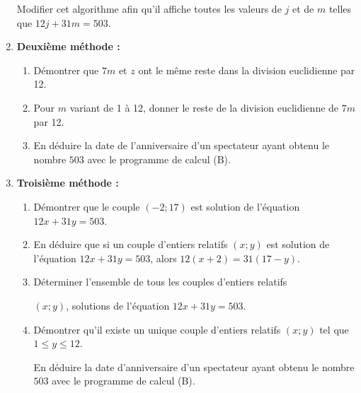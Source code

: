 \begin{enumerate}
Modifier cet algorithme afin qu'il affiche toutes les valeurs de $j$ et de $m$ telles que $12j+31m=503$.
\item
\textbf{Deuxième méthode :
}
\begin{enumerate}[label=\alph*.]
     \item
     Démontrer que $7m$ et $z$ ont le même reste dans la division euclidienne par 12.
     \item
     Pour $m$ variant de 1 à 12, donner le reste de la division euclidienne de $7m$ par 12.
     \item
En déduire la date de l'anniversaire d'un spectateur ayant obtenu le nombre $503$ avec le programme de calcul (B).\end{enumerate}
\item
\textbf{Troisième méthode :}
\begin{enumerate}[label=\alph*.]
     \item
     Démontrer que le couple $\left(-2 ; 17\right)$ est solution de l'équation $12x+31y=503$.
     \item
     En déduire que si un couple d'entiers relatifs $\left(x ; y\right)$ est solution de l'équation $12x+31y=503$, alors $12\left(x+2\right)=31 \left(17-y\right)$.
     \item
     Déterminer l'ensemble de tous les couples d'entiers relatifs
     \par
     $\left(x ; y\right)$, solutions de l'équation $12x+31y=503$.
     \item
     Démontrer qu'il existe un unique couple d'entiers relatifs $\left(x ; y\right)$ tel que $1 \leqslant  y \leqslant  12$.
     \par
En déduire la date d'anniversaire d'un spectateur ayant obtenu le nombre $503$ avec le programme de calcul (B).\end{enumerate}
\end{enumerate}
